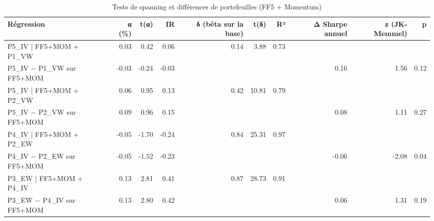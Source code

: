 \begin{table}[htbp]
\centering
\small
\caption{Tests de spanning et différences de portefeuilles (FF5 + Momentum)}
\label{tab:T7_spanning}
\begin{tabular}{lrrrrrrrrr}
\toprule
Régression & α (\%) & t(α) & IR & δ (bêta sur la base) & t(δ) & R² & Δ Sharpe annuel & z (JK-Memmel) & p \\
\midrule
P5\_IV | FF5+MOM + P1\_VW & 0.03 & 0.42 & 0.06 & 0.14 & 3.88 & 0.73 &  &  &  \\
P5\_IV − P1\_VW sur FF5+MOM & -0.03 & -0.24 & -0.03 &  &  &  & 0.16 & 1.56 & 0.12 \\
P5\_IV | FF5+MOM + P2\_VW & 0.06 & 0.95 & 0.13 & 0.42 & 10.81 & 0.79 &  &  &  \\
P5\_IV − P2\_VW sur FF5+MOM & 0.09 & 0.96 & 0.15 &  &  &  & 0.08 & 1.11 & 0.27 \\
P4\_IV | FF5+MOM + P2\_EW & -0.05 & -1.70 & -0.24 & 0.84 & 25.31 & 0.97 &  &  &  \\
P4\_IV − P2\_EW sur FF5+MOM & -0.05 & -1.52 & -0.23 &  &  &  & -0.06 & -2.08 & 0.04 \\
P3\_EW | FF5+MOM + P4\_IV & 0.13 & 2.81 & 0.41 & 0.87 & 28.73 & 0.91 &  &  &  \\
P3\_EW − P4\_IV sur FF5+MOM & 0.13 & 2.80 & 0.42 &  &  &  & 0.06 & 1.31 & 0.19 \\
\bottomrule
\end{tabular}
\end{table}
